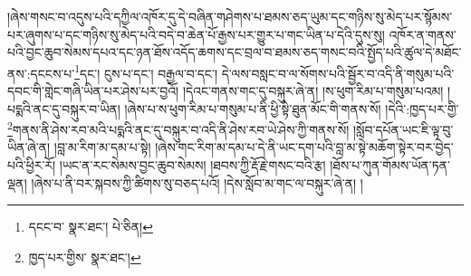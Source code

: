 །ཞེས་གསང་བ་འདུས་པའི་དཀྱིལ་འཁོར་དུ་དེ་བཞིན་གཤེགས་པ་ཐམས་ཅད་ཡུམ་དང་གཉིས་སུ་མེད་པར་སྙོམས་པར་ཞུགས་པ་དང་གཉིས་སུ་མེད་པའི་བདེ་བ་ཆེན་པོ་རྒྱས་པར་གྱུར་པ་གང་ཡིན་པ་དེའི་དུས་སུ། འཁོར་ན་གནས་པའི་བྱང་ཆུབ་སེམས་དཔའ་དང་ཉན་ཐོས་འདོད་ཆགས་དང་བྲལ་བ་ཐམས་ཅད་གསང་བའི་སྤྱོད་པའི་ཚུལ་དེ་མཐོང་ནས་:དངངས་པ་\footnote{དངང་བ་  སྣར་ཐང་།  པེ་ཅིན། }དང་། ངུས་པ་དང་། བརྒྱལ་བ་དང་། དེ་ལས་བསླང་བ་ལ་སོགས་པའི་སྦྱོར་བ་འདི་ནི་གསུམ་པའི་དབང་གི་གླེང་གཞི་ཡིན་པར་ཤེས་པར་བྱའོ། །དེའང་གནས་གང་དུ་བསྐུར་ཞེ་ན། །ས་ཕུག་རིམ་པ་གསུམ་པའམ། །པདྨའི་ནང་དུ་བསྐུར་བ་ཡིན། །ཞེས་པ་ས་ཕུག་རིམ་པ་གསུམ་པ་ནི་ཕྱི་སྟེ་ཐུན་མོང་གི་གནས་སོ། །དེའི་:ཁྱད་པར་གྱི་\footnote{ཁྱད་པར་གྱིས་  སྣར་ཐང་། }གནས་ནི་ཤེས་རབ་མའི་པདྨའི་ནང་དུ་བསྐུར་བ་འདི་ནི་ཤེས་རབ་ཡེ་ཤེས་ཀྱི་གནས་སོ། །སློབ་དཔོན་ཡང་ཇི་ལྟ་བུ་ཡིན་ཞེ་ན། །བླ་མ་རིག་མ་དམ་པ་སྟེ། །ཞེས་གང་རིག་མ་དམ་པ་དེ་ནི་ཡང་དག་པའི་བླ་མ་སྟེ་མཆོག་སྟེར་བར་བྱེད་པའི་ཕྱིར་རོ། །ཡང་ན་རང་སེམས་བྱང་ཆུབ་སེམས། །ཐབས་ཀྱི་རྡོ་རྗེ་གསང་བའི་རྩ། །ཐོས་པ་ཀུན་གོམས་ཡོན་ཏན་ལྡན། །ཞེས་པ་ནི་བར་སྐབས་ཀྱི་ཚིགས་སུ་བཅད་པའོ། །དེས་སློབ་མ་གང་ལ་བསྐུར་ཞེ་ན། །

